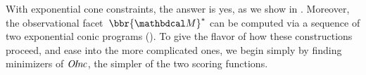 \documentclass[twoside]{article}
\newcommand\obslimit{observational facet} %
\begin{document}
With exponential cone constraints,
the answer is yes, as we show in .
Moreover,
the \obslimit\
$\bbr{\dg M}^*$ can be computed via a sequence of two exponential conic programs ().
To give the flavor of how these constructions proceed, and ease into the more complicated ones, we begin simply by finding minimizers of $\mathit{O\mskip-2.5muI\mskip-3.5mun\mskip-1.7muc}$, the simpler of the two scoring functions.

%
\end{document}
